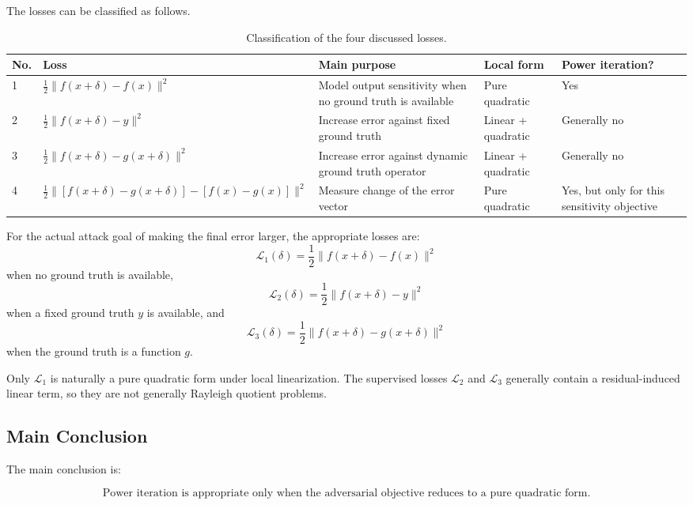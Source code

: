 \documentclass{article}
\begin{document}
The losses can be classified as follows.

\begin{table}[h]
\centering
\begin{tabular}{p{0.9cm} p{4.2cm} p{4.4cm} p{3.2cm} p{2.4cm}}
\hline
No. & Loss & Main purpose & Local form & Power iteration? \\
\hline
1 &
\(\frac{1}{2}\|f(x+\delta)-f(x)\|^2\)
&
Model output sensitivity when no ground truth is available
&
Pure quadratic
&
Yes
\\[1.2em]

2 &
\(\frac{1}{2}\|f(x+\delta)-y\|^2\)
&
Increase error against fixed ground truth
&
Linear + quadratic
&
Generally no
\\[1.2em]

3 &
\(\frac{1}{2}\|f(x+\delta)-g(x+\delta)\|^2\)
&
Increase error against dynamic ground truth operator
&
Linear + quadratic
&
Generally no
\\[1.2em]

4 &
\(\frac{1}{2}\|[f(x+\delta)-g(x+\delta)]-[f(x)-g(x)]\|^2\)
&
Measure change of the error vector
&
Pure quadratic
&
Yes, but only for this sensitivity objective
\\
\hline
\end{tabular}
\caption{Classification of the four discussed losses.}
\end{table}

For the actual attack goal of making the final error larger, the appropriate losses are:
\[
    \mathcal{L}_1(\delta)
    =
    \frac{1}{2}\|f(x+\delta)-f(x)\|^2
\]
when no ground truth is available,
\[
    \mathcal{L}_2(\delta)
    =
    \frac{1}{2}\|f(x+\delta)-y\|^2
\]
when a fixed ground truth \(y\) is available, and
\[
    \mathcal{L}_3(\delta)
    =
    \frac{1}{2}\|f(x+\delta)-g(x+\delta)\|^2
\]
when the ground truth is a function \(g\).

Only \(\mathcal{L}_1\) is naturally a pure quadratic form under local linearization. The supervised losses \(\mathcal{L}_2\) and \(\mathcal{L}_3\) generally contain a residual-induced linear term, so they are not generally Rayleigh quotient problems.

\subsection{Main Conclusion}

The main conclusion is:

\[
\boxed{
\text{Power iteration is appropriate only when the adversarial objective reduces to a pure quadratic form.}
}
\]
\end{document}
